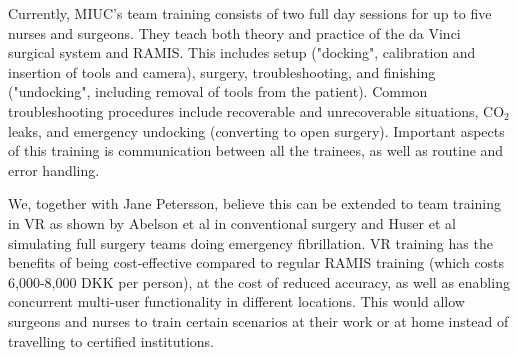 \documentclass[conference]{IEEEtran}
\begin{document}
Currently, MIUC's team training consists of two full day sessions for up to five nurses and surgeons. They teach both theory and practice of the da Vinci surgical system and RAMIS. This includes setup ("docking", calibration and insertion of tools and camera), surgery, troubleshooting, and finishing ("undocking", including removal of tools from the patient). Common troubleshooting procedures include recoverable and unrecoverable situations, CO$_2$ leaks, and emergency undocking (converting to open surgery). Important aspects of this training is communication between all the trainees, as well as routine and error handling.

We, together with Jane Petersson, believe this can be extended to team training in VR as shown by Abelson et al in conventional surgery and Huser et al simulating full surgery teams doing emergency fibrillation\citep{abelson_virtual_2015,huser_simulated_2014}. VR training has the benefits of being cost-effective compared to regular RAMIS training (which costs 6,000-8,000 DKK per person), at the cost of reduced accuracy, as well as enabling concurrent multi-user functionality in different locations. This would allow surgeons and nurses to train certain scenarios at their work or at home instead of travelling to certified institutions. 
\end{document}
